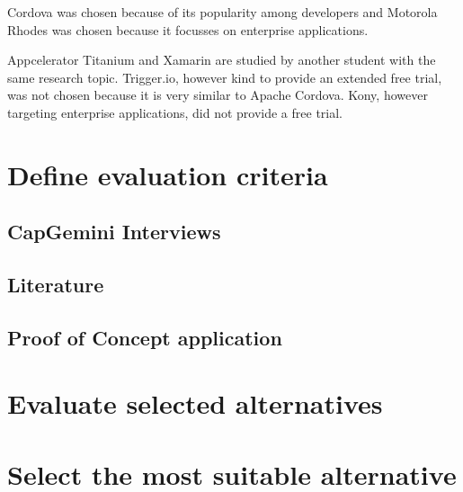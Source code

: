 Cordova was chosen because of its popularity among developers and  Motorola Rhodes was chosen because it focusses on enterprise applications. 

Appcelerator Titanium and Xamarin are studied by another student with the same research topic. Trigger.io, however kind to provide an extended free trial, was not chosen because it is very similar to Apache Cordova. Kony, however targeting enterprise applications, did not provide a free trial.


\section{Define evaluation criteria}



\subsection{CapGemini Interviews}

\subsection{Literature}

\subsection{Proof of Concept application}


\section{Evaluate selected alternatives}


\section{Select the most suitable alternative}


